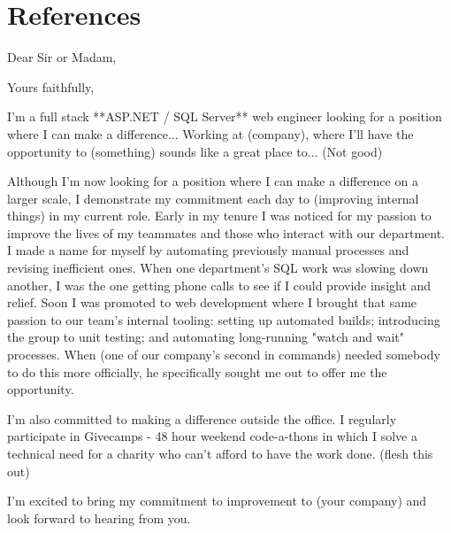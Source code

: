 \documentclass[11pt,a4paper,sans,english]{moderncv}        %
\begin{document}
\section{References}
\clearpage
\date{Date}
\opening{Dear Sir or Madam,}
\closing{Yours faithfully,}
\makelettertitle
I'm a full stack **ASP.NET / SQL Server** web engineer looking for a position where I can make a difference... Working at (company), where I'll have the opportunity to (something) sounds like a great place to... (Not good)

Although I'm now looking for a position where I can make a difference on a larger scale, I demonstrate my commitment each day to (improving internal things) in my current role. Early in my tenure I was noticed for my passion to improve the lives of my teammates and those who interact with our department. I made a name for myself by automating previously manual processes and revising inefficient ones. When one department's SQL work was slowing down another, I was the one getting phone calls to see if I could provide insight and relief. Soon I was promoted to web development where I brought that same passion to our team's internal tooling: setting up automated builds; introducing the group to unit testing; and automating long-running "watch and wait" processes. When (one of our company's second in commands) needed somebody to do this more officially, he specifically sought me out to offer me the opportunity. 

I'm also committed to making a difference outside the office. I regularly participate in Givecamps - 48 hour weekend code-a-thons in which I solve a technical need for a charity who can't afford to have the work done. (flesh this out)

I'm excited to bring my commitment to improvement to (your company) and look forward to hearing from you.
\makeletterclosing
\end{document}
